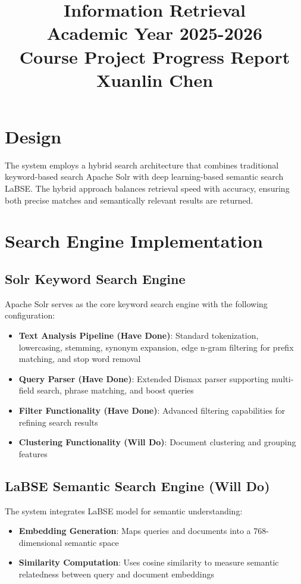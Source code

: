 \documentclass[11pt,a4paper]{article}
\title{Information Retrieval\\Academic Year 2025-2026\\\textbf{Course Project Progress Report}\\Xuanlin Chen}
\author{}
\date{}
\begin{document}
\maketitle
\vspace{-1.5em}

\section{Design}

The system employs a hybrid search architecture that combines traditional keyword-based search Apache Solr with deep learning-based semantic search LaBSE. The hybrid approach balances retrieval speed with accuracy, ensuring both precise matches and semantically relevant results are returned.

\section{Search Engine Implementation}

\subsection{Solr Keyword Search Engine}
Apache Solr serves as the core keyword search engine with the following configuration:
\begin{itemize}[leftmargin=*,nosep]
    \item \textbf{Text Analysis Pipeline (Have Done)}: Standard tokenization, lowercasing, stemming, synonym expansion, edge n-gram filtering for prefix matching, and stop word removal
    \item \textbf{Query Parser (Have Done)}: Extended Dismax parser supporting multi-field search, phrase matching, and boost queries
    \item \textbf{Filter Functionality (Have Done)}: Advanced filtering capabilities for refining search results
    \item \textbf{Clustering Functionality (Will Do)}: Document clustering and grouping features
\end{itemize}

\subsection{LaBSE Semantic Search Engine (Will Do)}
The system integrates LaBSE model for semantic understanding:
\begin{itemize}[leftmargin=*,nosep]
    \item \textbf{Embedding Generation}: Maps queries and documents into a 768-dimensional semantic space
    \item \textbf{Similarity Computation}: Uses cosine similarity to measure semantic relatedness between query and document embeddings
\end{itemize}
\end{document}
